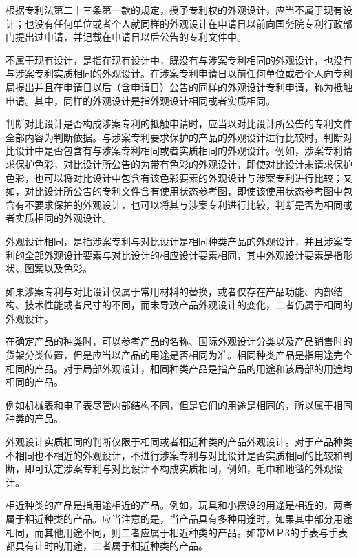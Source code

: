 根据专利法第二十三条第一款的规定，授予专利权的外观设计，应当不属于现有设计；也没有任何单位或者个人就同样的外观设计在申请日以前向国务院专利行政部门提出过申请，并记载在申请日以后公告的专利文件中。

不属于现有设计，是指在现有设计中，既没有与涉案专利相同的外观设计，也没有与涉案专利实质相同的外观设计。在涉案专利申请日以前任何单位或者个人向专利局提出并且在申请日以后（含申请日）公告的同样的外观设计专利申请，称为抵触申请。其中，同样的外观设计是指外观设计相同或者实质相同。

判断对比设计是否构成涉案专利的抵触申请时，应当以对比设计所公告的专利文件全部内容为判断依据。与涉案专利要求保护的产品的外观设计进行比较时，判断对比设计中是否包含有与涉案专利相同或者实质相同的外观设计。例如，涉案专利请求保护色彩，对比设计所公告的为带有色彩的外观设计，即使对比设计未请求保护色彩，也可以将对比设计中包含有该色彩要素的外观设计与涉案专利进行比较；又如，对比设计所公告的专利文件含有使用状态参考图，即使该使用状态参考图中包含有不要求保护的外观设计，也可以将其与涉案专利进行比较，判断是否为相同或者实质相同的外观设计。

外观设计相同，是指涉案专利与对比设计是相同种类产品的外观设计，并且涉案专利的全部外观设计要素与对比设计的相应设计要素相同，其中外观设计要素是指形状、图案以及色彩。

如果涉案专利与对比设计仅属于常用材料的替换，或者仅存在产品功能、内部结构、技术性能或者尺寸的不同，而未导致产品外观设计的变化，二者仍属于相同的外观设计。

在确定产品的种类时，可以参考产品的名称、国际外观设计分类以及产品销售时的货架分类位置，但是应当以产品的用途是否相同为准。相同种类产品是指用途完全相同的产品。对于局部外观设计，相同种类产品是指产品的用途和该局部的用途均相同的产品。

例如机械表和电子表尽管内部结构不同，但是它们的用途是相同的，所以属于相同种类的产品。

外观设计实质相同的判断仅限于相同或者相近种类的产品外观设计。对于产品种类不相同也不相近的外观设计，不进行涉案专利与对比设计是否实质相同的比较和判断，即可认定涉案专利与对比设计不构成实质相同，例如，毛巾和地毯的外观设计。

相近种类的产品是指用途相近的产品。例如，玩具和小摆设的用途是相近的，两者属于相近种类的产品。应当注意的是，当产品具有多种用途时，如果其中部分用途相同，而其他用途不同，则二者应属于相近种类的产品。如带ＭＰ3的手表与手表都具有计时的用途，二者属于相近种类的产品。

